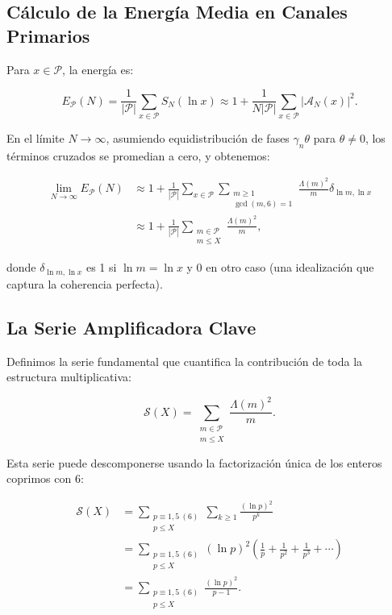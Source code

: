 \documentclass[12pt, a4paper]{article}
\theoremstyle{plain}
\theoremstyle{definition}
\theoremstyle{remark}
\begin{document}
\subsection{Cálculo de la Energía Media en Canales Primarios}

Para $x \in \mathcal{P}$, la energía es:

\[
E_{\mathcal{P}}(N) = \frac{1}{|\mathcal{P}|} \sum_{x \in \mathcal{P}} S_N(\ln x) \approx 1 + \frac{1}{N|\mathcal{P}|} \sum_{x \in \mathcal{P}} |\mathcal{A}_N(x)|^2.
\]

En el límite $N \to \infty$, asumiendo equidistribución de fases $\gamma_n \theta$ para $\theta \neq 0$, los términos cruzados se promedian a cero, y obtenemos:

\begin{align*}
\lim_{N \to \infty} E_{\mathcal{P}}(N) &\approx 1 + \frac{1}{|\mathcal{P}|} \sum_{x \in \mathcal{P}} \sum_{\substack{m \geq 1 \\ \gcd(m,6)=1}} \frac{\Lambda(m)^2}{m} \delta_{\ln m, \ln x} \\
&\approx 1 + \frac{1}{|\mathcal{P}|} \sum_{\substack{m \in \mathcal{P} \\ m \leq X}} \frac{\Lambda(m)^2}{m},
\end{align*}

donde $\delta_{\ln m, \ln x}$ es 1 si $\ln m = \ln x$ y 0 en otro caso (una idealización que captura la coherencia perfecta).

\subsection{La Serie Amplificadora Clave}

Definimos la serie fundamental que cuantifica la contribución de toda la estructura multiplicativa:

\[
\mathcal{S}(X) = \sum_{\substack{m \in \mathcal{P} \\ m \leq X}} \frac{\Lambda(m)^2}{m}.
\]

Esta serie puede descomponerse usando la factorización única de los enteros coprimos con 6:

\begin{align*}
\mathcal{S}(X) &= \sum_{\substack{p \equiv 1,5 \ (6) \\ p \leq X}} \sum_{k \geq 1} \frac{(\ln p)^2}{p^k} \\
&= \sum_{\substack{p \equiv 1,5 \ (6) \\ p \leq X}} (\ln p)^2 \left( \frac{1}{p} + \frac{1}{p^2} + \frac{1}{p^3} + \cdots \right) \\
&= \sum_{\substack{p \equiv 1,5 \ (6) \\ p \leq X}} \frac{(\ln p)^2}{p-1}.
\end{align*}
\end{document}
